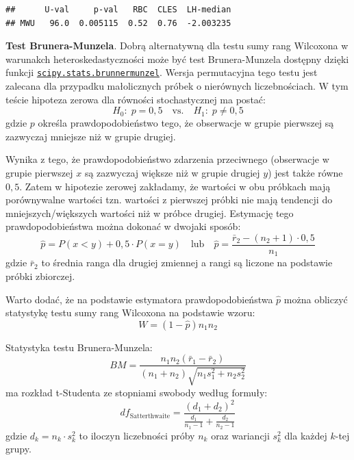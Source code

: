 \documentclass[polish,]{book}
\begin{document}
\begin{verbatim}
##      U-val     p-val   RBC  CLES  LH-median
## MWU   96.0  0.005115  0.52  0.76  -2.003235
\end{verbatim}

\textbf{Test Brunera-Munzela}. Dobrą alternatywną dla testu sumy rang Wilcoxona w warunakch heteroskedastyczności może być test Brunera-Munzela \citep{bm2000} dostępny dzięki funkcji \href{https://docs.scipy.org/doc/scipy/reference/generated/scipy.stats.brunnermunzel.html\#scipy.stats.brunnermunzel}{\texttt{scipy.stats.brunnermunzel}}. Wersja permutacyjna tego testu \citep{neub2007} jest zalecana dla przypadku małolicznych próbek o nierównych liczebnościach. W tym teście
hipoteza zerowa dla równości stochastycznej ma postać:
\begin{equation}
H_0:\;p=0,5\quad\textrm{vs.}\quad H_{1}:\;p\neq 0,5
\label{eq:mw04}
\end{equation}
gdzie \(p\) określa prawdopodobieństwo tego, że obserwacje w grupie pierwszej są zazwyczaj mniejsze niż w grupie drugiej.

Wynika z tego, że prawdopodobieństwo zdarzenia przeciwnego (obserwacje w grupie pierwszej \(x\) są zazwyczaj większe niż w grupie drugiej \(y\)) jest także równe \(0,5\). Zatem w hipotezie zerowej zakładamy, że wartości w obu próbkach mają porównywalne wartości tzn. wartości z pierwszej próbki nie mają tendencji do mniejszych/większych wartości niż w próbce drugiej. Estymację tego prawdopodobieństwa można dokonać w dwojaki sposób:
\begin{equation}
\hat{p}=P(x<y)+0,5\cdot P(x=y)\quad\mbox{lub} \quad \hat{p}=\frac{\bar{r}_2-(n_2+1)\cdot 0,5}{n_1}
\label{eq:mw05}
\end{equation}
gdzie \(\bar{r}_2\) to średnia ranga dla drugiej zmiennej a rangi są liczone na podstawie próbki zbiorczej.

Warto dodać, że na podstawie estymatora prawdopodobieństwa \(\hat{p}\) można obliczyć statystykę testu sumy rang Wilcoxona na podstawie wzoru:
\begin{equation}
W=(1-\hat{p})n_1n_2
\label{eq:mw06}
\end{equation}

Statystyka testu Brunera-Munzela:
\begin{equation}
BM=\frac{n_1n_2(\bar{r}_1-\bar{r}_2)}{(n_1+n_2)\sqrt{n_1s_1^2+n_2s_2^2}}
\label{eq:mw07}
\end{equation}
ma rozkład t-Studenta ze stopniami swobody według formuły:
\begin{equation}
df_{\mathrm{Satterthwaite}}=\frac{(d_1+d_2)^2}{\frac{d_1}{n_1-1}+\frac{d_2}{n_2-1}}
\label{eq:mw08}
\end{equation}
gdzie \(d_k=n_k\cdot s^2_k\) to iloczyn liczebności próby \(n_k\) oraz wariancji \(s_k^2\) dla każdej \(k\)-tej grupy.
\end{document}
